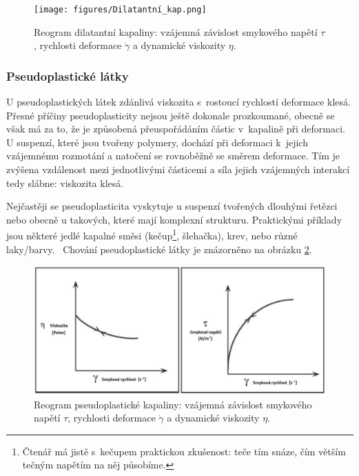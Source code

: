 \documentclass[12pt]{article}
\begin{document}
\begin{figure}
    \centering
    \texttt{[image: figures/Dilatantní\_kap.png]}
    \caption{Reogram dilatantní kapaliny: vzájemná závislost smykového napětí $\tau$, rychlosti deformace $\dot\gamma$ a dynamické viskozity $\eta$.~\cite{thesis:Viskozimetr_pro_viskozni_materialy}}
    \label{fig:dilatantní_kap}
\end{figure}

\subsubsection{Pseudoplastické látky}%

U pseudoplastických látek zdánlivá viskozita s~rostoucí rychlostí deformace klesá. Přesné příčiny pseudoplasticity nejsou ještě dokonale prozkoumané, obecně se však má za to, že je způsobená přeuspořádáním částic v~kapalině při deformaci. U suspenzí, které jsou tvořeny polymery, dochází při deformaci k~jejich vzájemnému rozmotání a natočení se rovnoběžně se směrem deformace. Tím je zvýšena vzdálenost mezi jednotlivými částicemi a síla jejich vzájemných interakcí tedy slábne: viskozita klesá.~\cite{wiki:Shear_thinning}
\label{sec:pseudoplasticita}
\par
Nejčastěji se pseudoplasticita vyskytuje u suspenzí tvořených dlouhými řetězci nebo obecně u takových, které mají komplexní strukturu. Praktickými příklady jsou některé jedlé kapalné směsi (kečup\footnote{Čtenář má jistě s~kečupem praktickou zkušenost: teče tím snáze, čím větším tečným napětím na něj působíme.}, šlehačka), krev, nebo různé laky/barvy.~\cite{wiki:Shear_thinning} Chování pseudoplastické látky je znázorněno na obrázku \ref{fig:pseudoplast_kap}.

\begin{figure}
    \centering
    \includegraphics[width=\linewidth]{figures/Pseudoplast_kap.png}
    \caption{Reogram pseudoplastické kapaliny: vzájemná závislost smykového napětí $\tau$, rychlosti deformace $\dot\gamma$ a dynamické viskozity $\eta$.~\cite{thesis:Viskozimetr_pro_viskozni_materialy}}
    \label{fig:pseudoplast_kap}
\end{figure}
\end{document}

